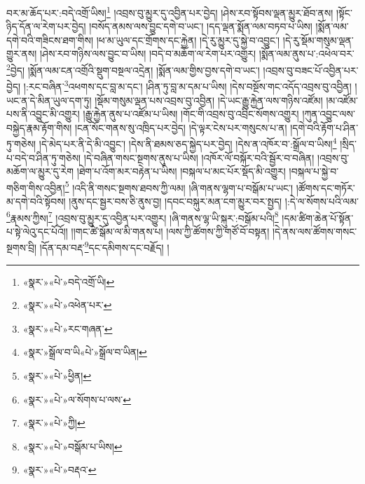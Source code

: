 བར་མ་ཆོད་པར་:བདེ་འགྲོ་ཡིས།\footnote{«སྣར་»«པེ་»བདེ་འགྲོ་ཡི།} །འབྲས་བུ་མྱུར་དུ་འབྱིན་པར་བྱེད། །ཤེས་རབ་སྟོབས་ལྡན་མྱུར་ཐོབ་ནས། །སྟོང་ཉིད་དོན་ལ་རེག་པར་བྱེད། །བསོད་ནམས་ལས་བྱུང་དགེ་བ་ཡང་། །དད་ལྡན་སྨོན་ལམ་བཏབ་པ་ཡིས། །སྨོན་ལམ་དགེ་བའི་གཟིངས་ཐག་གིས། །ཕ་མ་ཡུལ་དང་གྲོགས་དང་རྐྱེན། །དེ་རུ་མྱུར་དུ་སྐྱེ་བ་འབྱུང་། །དེ་རུ་སྡོམ་གསུམ་ལྡན་གྱུར་ནས། །ཤེས་རབ་གཉིས་ལས་བྱུང་བ་ཡིས། །བདེ་བ་མཆོག་ལ་རེག་པར་འགྱུར། །སྨོན་ལམ་ནུས་པ་:འཕེལ་བར་\footnote{«སྣར་»«པེ་»འཕེན་པར་}བྱེད། །སྨོན་ལམ་ངན་འགྲོའི་སྡུག་བསྔལ་འདྲེན། །སྨོན་ལམ་གྱིས་བྱས་དགེ་བ་ཡང་། །འབྲས་བུ་བཟང་པོ་འབྱིན་པར་བྱེད། །:རང་བཞིན་\footnote{«སྣར་»«པེ་»རང་གཞན་}འཕགས་དང་བླ་མ་དང་། །ཤིན་ཏུ་བླ་མ་དམ་པ་ཡིས། །དེས་བསྔོས་གང་འདོད་འབྲས་བུ་འབྱིན། །ཡང་ན་དེ་མིན་ཡུལ་དག་ཏུ། །སྡོམ་གསུམ་ལྡན་པས་འབྲས་བུ་འབྱིན། །དེ་ཡང་རྒྱུ་རྐྱེན་ལས་གཉིས་འཛོམ། །མ་འཛོམ་པས་ནི་འབྱུང་མི་འགྱུར། །རྒྱུ་རྐྱེན་ནུས་པ་འཛོམ་པ་ཡིས། །གོང་གི་འབྲས་བུ་འབྲིང་སོགས་འགྱུར། །ཀུན་འབྱུང་ལས་བསྐྱེད་རྣམ་རྟོག་གིས། །ངན་སོང་གནས་སུ་འཁྲིད་པར་བྱེད། །དེ་ལྟར་ངེས་པར་གསུངས་པ་ན། །དགེ་བའི་རྟོག་པ་ཤིན་ཏུ་གཅེས། །དེ་མེད་པར་ནི་དེ་མི་འབྱུང་། །དེས་ནི་ཐམས་ཅད་སྐྱེད་པར་བྱེད། །དེས་ན་འཁོར་བ་:སྒྲོལ་བ་ཡིས།\footnote{«སྣར་»སྒྲོལ་བ་ཡི«པེ་»སྒྲོལ་བ་ཡིན།} །སྲིད་པ་བདེ་བ་ཤིན་ཏུ་གཅེས། །དེ་བཞིན་གསང་སྔགས་ནུས་པ་ཡིས། །འཁོར་ལོ་བསྐོར་བའི་སྦྱོར་བ་བཞིན། །འབྲས་བུ་མཆོག་ལ་མྱུར་དུ་རེག །ཐེག་པ་འོག་མར་བརྟེན་པ་ཡིས། །བསྐལ་པ་མང་པོར་སྡོད་མི་འགྱུར། །བསྐལ་པ་སྐྱེ་བ་གཅིག་གིས་འབྱིན།\footnote{«སྣར་»«པེ་»ཕྱིན།} །འདི་ནི་གསང་སྔགས་ཐབས་ཀྱི་ལམ། །ཞི་གནས་ལྷག་པ་བསྒོམ་པ་ཡང་། །ཚོགས་དང་གཏོར་མ་དགེ་བའི་སྟོབས། །ནུས་དང་སྦྱར་བས་ཅི་ནུས་བྱ། །དབང་བསྐུར་མན་ངག་མྱུར་བར་སྤྱད། །:དེ་ལ་སོགས་པའི་ལམ་\footnote{«སྣར་»«པེ་»ལ་སོགས་པ་ལས་}རྣམས་ཀྱིས།\footnote{«སྣར་»«པེ་»ཀྱི།} །འབྲས་བུ་མྱུར་དུ་འབྱིན་པར་འགྱུར། །ཞི་གནས་ལྷ་ཡི་སྐུར་:བསྒོམ་པའི།\footnote{«སྣར་»«པེ་»བསྒོམ་པ་ཡིས།} །དམ་ཚིག་ཆེན་པོ་སྟོན་པ་སྟེ་ལེའུ་དང་པོའོ།། །།གང་ཚེ་སྒོམ་ལ་མི་གནས་པ། །ལས་ཀྱི་ཚོགས་ཀྱི་གཙོ་བོ་བསྟན། །དེ་ནས་ལས་ཚོགས་གསང་སྔགས་བྲི། །དོན་དམ་བརྡ་\footnote{«སྣར་»«པེ་»བརྡའ་}དང་དམིགས་དང་བརྗོད། །
